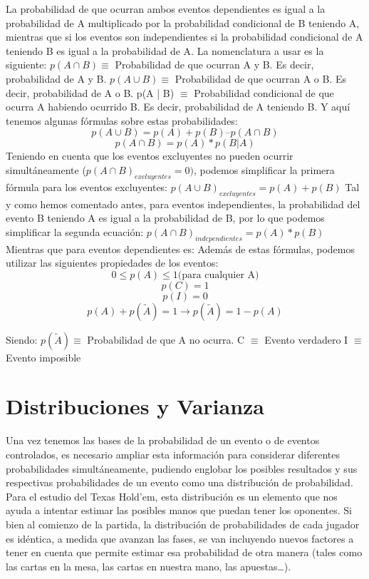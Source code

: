 La probabilidad de que ocurran ambos eventos dependientes es igual a la probabilidad de A multiplicado por la probabilidad condicional de B teniendo A, mientras que si los eventos son independientes si la probabilidad condicional de A teniendo B es igual a la probabilidad de A.
La nomenclatura a usar es la siguiente:
$p(A \cap B) \equiv$ Probabilidad de que ocurran A y B. Es decir, probabilidad de A y B.
$p(A \cup B) \equiv$ Probabilidad de que ocurran A o B. Es decir, probabilidad de A o B. 
p(A | B) $\equiv$ Probabilidad condicional de que ocurra A habiendo ocurrido B. Es decir, probabilidad de A teniendo B.
Y aquí tenemos algunas fórmulas sobre estas probabilidades:
\[
p(A \cup B) = p(A) + p(B) – p(A \cap B)
\]
\[
p(A\cap B) = p(A)*p(B | A)
\]
Teniendo en cuenta que los eventos excluyentes no pueden ocurrir simultáneamente ($p(A \cap B)_{excluyentes} = 0)$, podemos simplificar la primera fórmula para los eventos excluyentes:
$p(A \cup B)_{excluyentes} = p(A) + p(B)$
Tal y como hemos comentado antes, para eventos independientes, la probabilidad del evento B teniendo A es igual a la probabilidad de B, por lo que podemos simplificar la segunda ecuación:
$p(A \cap B)_{independientes} = p(A)*p(B)$
Mientras que para eventos dependientes es:
Además de estas fórmulas, podemos utilizar las siguientes propiedades de los eventos:
\[
0 \leq p(A) \leq 1\text{(para cualquier A)}
\]
\[
p(C) = 1
\]
\[
p(I) = 0
\]
\[
p(A) + p (\tilde{A}) = 1\rightarrow p (\tilde{A}) = 1 - p(A)
\]

Siendo:
$p(\tilde{A}) \equiv$ Probabilidad de que A no ocurra.
C $\equiv$ Evento verdadero
I $\equiv$ Evento imposible


\section{Distribuciones y Varianza}

Una vez tenemos las bases de la probabilidad de un evento o de eventos controlados, es necesario ampliar esta información para considerar diferentes probabilidades simultáneamente, pudiendo englobar los posibles resultados y sus respectivas probabilidades de un evento como una distribución de probabilidad.
Para el estudio del Texas Hold’em, esta distribución es un elemento que nos ayuda a intentar estimar las posibles manos que puedan tener los oponentes. Si bien al comienzo de la partida, la distribución de probabilidades de cada jugador es idéntica, a medida que avanzan las fases, se van incluyendo nuevos factores a tener en cuenta que permite estimar esa probabilidad de otra manera (tales como las cartas en la mesa, las cartas en nuestra mano, las apuestas…).

